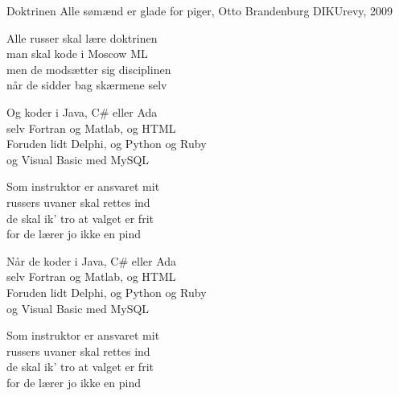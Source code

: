 \begin{song}{Doktrinen}
  {} %
  {Alle sømænd er glade for piger, Otto Brandenburg} %
  {} %
  {DIKUrevy, 2009} %
  {\NotCCLIed} %

  \begin{SBVerse}
    Alle russer skal lære doktrinen\\
    man skal kode i Moscow ML\\
    men de modsætter sig disciplinen\\
    når de sidder bag skærmene selv
  \end{SBVerse}

  \begin{SBChorus}
    Og koder i Java, C\# eller Ada\\
    selv Fortran og Matlab, og HTML\\
    Foruden lidt Delphi, og Python og Ruby\\
    og Visual Basic med MySQL
  \end{SBChorus}

  \begin{SBVerse}
    Som instruktor er ansvaret mit\\
    russers uvaner skal rettes ind\\
    de skal ik' tro at valget er frit\\
    for de lærer jo ikke en pind
  \end{SBVerse}

  \begin{SBChorus}
    Når de koder i Java, C\# eller Ada\\
    selv Fortran og Matlab, og HTML\\
    Foruden lidt Delphi, og Python og Ruby\\
    og Visual Basic med MySQL
  \end{SBChorus}

  \begin{SBVerse}
    Som instruktor er ansvaret mit\\
    russers uvaner skal rettes ind\\
    de skal ik' tro at valget er frit\\
    for de lærer jo ikke en pind
  \end{SBVerse}


\end{song}
